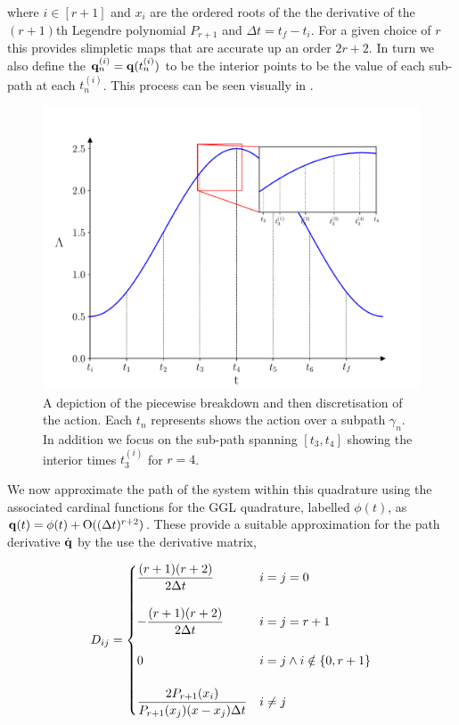 
where $i \in [r + 1]$ and $x_i$ are the ordered roots of the the derivative of the $(r + 1)$th Legendre polynomial $P_{r + 1}$ and $\Delta t = t_f - t_i$. For a given choice of $r$ this provides slimpletic maps that are accurate up an order $2r + 2$\cite{tsangSLIMPLECTICINTEGRATORSVARIATIONAL2015}. In turn we also define the $\vb{q}_n^{(i)} = \vb{q}(t^{(i)}_n)$ to be the interior points to be the value of each sub-path at each $t^{(i)}_n$. This process can be seen visually in .

\begin{figure}[t]
  \includegraphics[width=\columnwidth]{figures/si-process.pdf}
  \caption{A depiction of the piecewise breakdown and then discretisation of the action. Each $t_n$ represents shows the action over a subpath $\gamma_n$. In addition we focus on the sub-path spanning $[t_3, t_4]$ showing the interior times $t_{3}^{(i)}$ for $r = 4$.}
  \label{fig:si-process}
\end{figure}

We now approximate the path of the system within this quadrature using the associated cardinal functions for the GGL quadrature, labelled $\phi(t)$, as \(\vb q(t) = \phi(t) + \mathord{\mathrm{O}}((\Delta t)^{r + 2})\). These provide a suitable approximation for the path derivative $\dot{\vb q}$ by the use the derivative matrix,

\begin{equation}
\label{eq:dij}
  D_{ij} = \begin{cases}
  	\dfrac{(r + 1)(r + 2)}{2\Delta t} &i = j = 0 \\\\
  	-\dfrac{(r + 1)(r + 2)}{2\Delta t} & i = j = r + 1 \\\\
  	0 & i = j \land i \notin \left\{0, r + 1\right\} \\\\
  	\dfrac{2P_{r + 1}(x_i)}{P_{r+1}(x_j)(x - x_j)\Delta t} & i\neq j
  \end{cases}
\end{equation}

